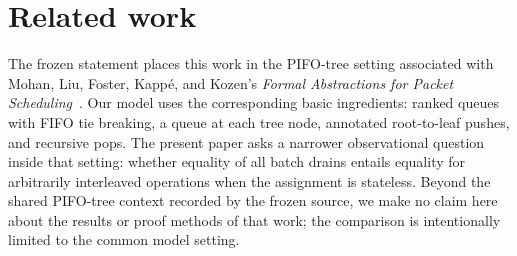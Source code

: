 \section{Related work}
\label{sec:related-work}

The frozen statement places this work in the PIFO-tree setting associated with
Mohan, Liu, Foster, Kapp{\'e}, and Kozen's \emph{Formal Abstractions for Packet
Scheduling}~\cite{mohan-oopsla23}.  Our model uses the corresponding basic
ingredients: ranked queues with FIFO tie breaking, a queue at each tree node,
annotated root-to-leaf pushes, and recursive pops.  The present paper asks a
narrower observational question inside that setting: whether equality of all
batch drains entails equality for arbitrarily interleaved operations when the
assignment is stateless.  Beyond the shared PIFO-tree context recorded by the
frozen source, we make no claim here about the results or proof methods of that
work; the comparison is intentionally limited to the common model setting.
